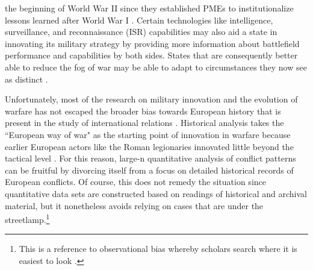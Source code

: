 \documentclass[12pt,letterpaper]{article}
\begin{document}
the beginning of World War II since they established PMEs to institutionalize lessons learned after World War I \citep{spires_imagerealitymaking_1984}. Certain technologies like intelligence, surveillance, and reconnaissance (ISR) capabilities may also aid a state in innovating its military strategy by providing more information about battlefield performance and capabilities by both sides. States that are consequently better able to reduce the fog of war may be able to adapt to circumstances they now see as distinct \citep{owens_liftingfogwar_2001}.
	
	Unfortunately, most of the research on military innovation and the evolution of warfare has not escaped the broader bias towards European history that is present in the study of international relations \citep{kang_usbiasstudy_2019}. Historical analysis takes the ``European way of war" as the starting point of innovation in warfare because earlier European actors like the Roman legionaries innovated little beyond the tactical level \citep{knox_dynamicsmilitaryrevolution_2001}. For this reason, large-n quantitative analysis of conflict patterns can be fruitful by divorcing itself from a focus on detailed historical records of European conflicts. Of course, this does not remedy the situation since quantitative data sets are constructed based on readings of historical and archival material, but it nonetheless avoids relying on cases that are under the streetlamp.\footnote{This is a reference to observational bias whereby scholars search where it is easiest to look \citep{kaplan_conductinquiry_1973}.}
\end{document}
